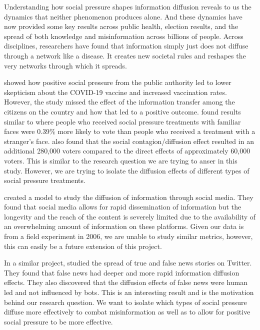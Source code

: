 \documentclass[11pt]{article}
\begin{document}
Understanding how social pressure shapes information diffusion reveals to us the dynamics that neither phenomenon produces alone. And these dynamics have now provided some key results across public health, election results, and the spread of both knowledge and misinformation across billions of people. Across disciplines, researchers have found that information simply just does not diffuse through a network like a disease. It creates new societal rules and reshapes the very networks through which it spreads. 

\cite{hong_covid-19_2023} showed how positive social pressure from the public authority led to lower skepticism about the COVID-19 vaccine and increased vaccination rates. However, the study missed the effect of the information transfer among the citizens on the country and how that led to a positive outcome. \cite{bond_61-million-person_2012} found results similar to \cite{gerber_social_2008} where people who received social pressure treatments with familiar faces were 0.39\% more likely to vote than people who received a treatment with a stranger's face. \cite{bond_61-million-person_2012} also found that the social contagion/diffusion effect resulted in an additional 280,000 voters compared to the direct effects of approximately 60,000 voters. This is similar to the research question we are trying to anser in this study. However, we are trying to isolate the diffusion effects of different types of social pressure treatments.

\cite{atienza-barthelemy_modeling_2025} created a model to study the diffusion of information through social media. They found that social media allows for rapid dissemination of information but the longevity and the reach of the content is severely limited due to the availability of an overwhelming amount of information on these platforms. Given our data is from a field experiment in 2006, we are unable to study similar metrics, however, this can easily be a future extension of this project.

In a similar project, \cite{vosoughi_spread_2018} studied the spread of true and false news stories on Twitter. They found that false news had deeper and more rapid information diffusion effects. They also discovered that the diffusion effects of false news were human led and not influenced by bots. This is an interesting result and is the motivation behind our research question. We want to isolate which types of social pressure diffuse more effectively to combat misinformation as well as to allow for positive social pressure to be more effective. 
\end{document}
